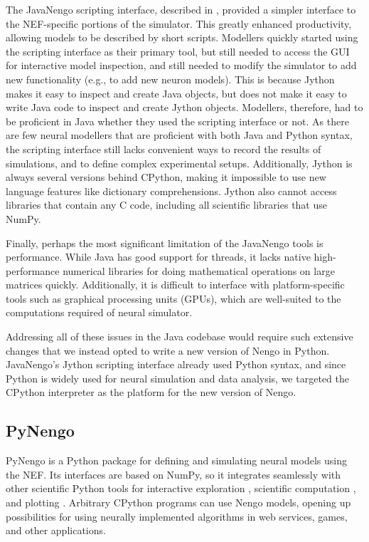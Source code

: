 \documentclass{frontiersSCNS}
\begin{document}
The JavaNengo scripting interface,
described in \cite{TODO},
provided a simpler interface
to the NEF-specific portions of the simulator.
This greatly enhanced productivity,
allowing models to be described
by short scripts.
Modellers quickly started using
the scripting interface
as their primary tool,
but still needed to access the GUI
for interactive model inspection,
and still needed to modify the simulator
to add new functionality
(e.g., to add new neuron models).
This is because Jython makes it easy
to inspect and create Java objects,
but does not make it easy to
write Java code to
inspect and create Jython objects.
Modellers, therefore, had to be
proficient in Java whether
they used the scripting interface or not.
As there are few neural modellers
that are proficient with both Java and Python syntax,
the scripting interface still lacks
convenient ways to record the results of simulations,
and to define complex experimental setups.
Additionally, Jython is always several versions
behind CPython, making it impossible
to use new language features
like dictionary comprehensions.
Jython also cannot access libraries
that contain any C code,
including all scientific libraries
that use NumPy.

Finally, perhaps the most significant limitation
of the JavaNengo tools is performance.
While Java has good support for threads,
it lacks native high-performance numerical libraries
for doing mathematical operations on large matrices quickly.
Additionally, it is difficult to interface with
platform-specific tools such as
graphical processing units (GPUs),
which are well-suited to the computations
required of neural simulator.

Addressing all of these issues
in the Java codebase would require
such extensive changes
that we instead opted
to write a new version of Nengo in Python.
JavaNengo's Jython scripting interface
already used Python syntax,
and since Python is widely used
for neural simulation and data analysis,
we targeted the CPython interpreter
as the platform for the new version of Nengo.

\subsection{PyNengo}

PyNengo is a Python package for
defining and simulating
neural models using the NEF.
Its interfaces are based on NumPy,
so it integrates seamlessly
with other scientific Python tools
for interactive exploration \cite{TODO}, %
scientific computation \cite{TODO}, %
and plotting \cite{TODO}. %
Arbitrary CPython programs
can use Nengo models,
opening up possibilities
for using neurally implemented algorithms
in web services, games, and other applications.
\end{document}
